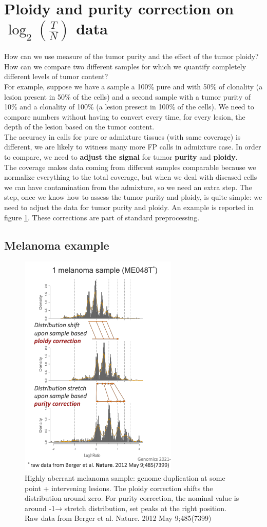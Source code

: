 \section{Ploidy and purity correction on $\log_2(\frac{T}{N})$ data}
How can we use measure of the tumor purity and the effect of the tumor ploidy? How can we compare two different samples for which we quantify completely different levels of tumor content?
\\
For example, suppose we have a sample a 100\% pure and with 50\% of clonality (a lesion present in 50\% of the cells) and a second sample with a tumor purity of 10\% and a clonality of 100\% (a lesion present in 100\% of the cells). We need to compare numbers without having to convert every time, for every lesion, the depth of the lesion based on the tumor content.
\\
The accuracy in calls for pure or admixture tissues (with same coverage) is different, we are likely to witness many more FP calls in admixture case. In order to compare, we need to \textbf{adjust the signal} for tumor \textbf{purity} and \textbf{ploidy}.
\\
The coverage makes data coming from different samples comparable because we normalize everything to the total coverage, but when we deal with diseased cells we can have contamination from the admixture, so we need an extra step. The step, once we know how to assess the tumor purity and ploidy, is quite simple: we need to adjust the data for tumor purity and ploidy. An example is reported in figure \ref{fig:ploidy1}. These corrections are part of standard preprocessing.

\subsection{Melanoma example}

\begin{figure}[H]
\centering
\includegraphics[width=0.4\linewidth]{image7.png}
\caption{Highly aberrant melanoma sample: genome duplication at some point + intervening lesions. The ploidy correction shifts the distribution around zero. For purity correction, the nominal value is around -1→ stretch distribution, set peaks at the right position.
Raw data from Berger et al. Nature. 2012 May 9;485(7399)}
\label{fig:ploidy1}
\end{figure}

